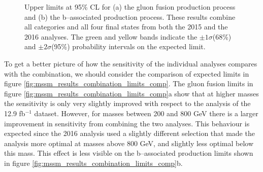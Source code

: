 \begin{figure}[h!]
\begin{center}
\end{center}
\caption{Upper limits at 95\% CL for (a) the gluon fusion production
process and (b) the b--associated production process. These results
combine all categories and all four final states from both the 2015
and the 2016 analyses. The green and yellow bands indicate
the $\pm 1\sigma$(68\%) and $\pm 2\sigma$(95\%) probability intervals on the expected limit.}
\label{fig:mssm_results_combination_limits}
\end{figure}

To get a better picture of how the sensitivity of the individual analyses compares
with the combination, we should consider the comparison
of expected limits in figure \ref{fig:mssm_results_combination_limits_comp}. The
gluon fusion limits in figure \ref{fig:mssm_results_combination_limits_comp}a show that at
higher masses the sensitivity is only very slightly improved with respect to the 
analysis of the 12.9 fb$^{-1}$ dataset. However, for masses between 200 and 800 GeV
there is a larger improvement in sensitivity from combining the two analyses.
This behaviour is expected since the 2016 analysis used a slightly different
selection that made the analysis more optimal at masses above 800 GeV,
and slightly less optimal below this mass. This
effect is less visible on the b--associated production limits shown in figure \ref{fig:mssm_results_combination_limits_comp}b.

